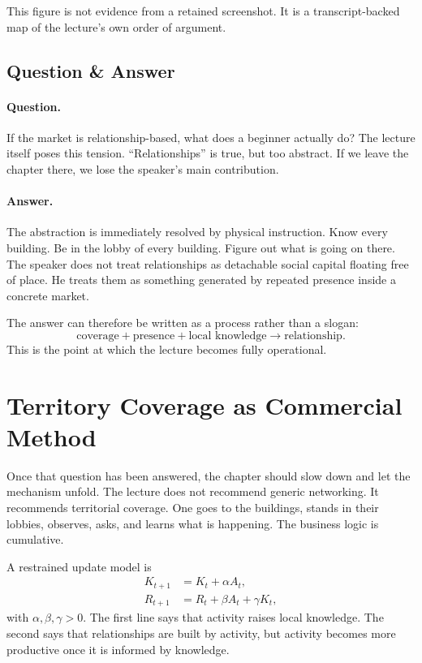 This figure is not evidence from a retained screenshot. It is a transcript-backed map of the lecture's own order of argument.

\subsection{Question \& Answer}

\paragraph{Question.} If the market is relationship-based, what does a beginner actually do? The lecture itself poses this tension. ``Relationships'' is true, but too abstract. If we leave the chapter there, we lose the speaker's main contribution.

\paragraph{Answer.} The abstraction is immediately resolved by physical instruction. Know every building. Be in the lobby of every building. Figure out what is going on there. The speaker does not treat relationships as detachable social capital floating free of place. He treats them as something generated by repeated presence inside a concrete market.

The answer can therefore be written as a process rather than a slogan:
\begin{equation}
\text{coverage} + \text{presence} + \text{local knowledge} \to \text{relationship}.
\end{equation}
This is the point at which the lecture becomes fully operational.

\section{Territory Coverage as Commercial Method}

Once that question has been answered, the chapter should slow down and let the mechanism unfold. The lecture does not recommend generic networking. It recommends territorial coverage. One goes to the buildings, stands in their lobbies, observes, asks, and learns what is happening. The business logic is cumulative.

A restrained update model is
\begin{align}
K_{t+1} &= K_t + \alpha A_t, \\
R_{t+1} &= R_t + \beta A_t + \gamma K_t,
\end{align}
with \(\alpha,\beta,\gamma > 0\). The first line says that activity raises local knowledge. The second says that relationships are built by activity, but activity becomes more productive once it is informed by knowledge.

